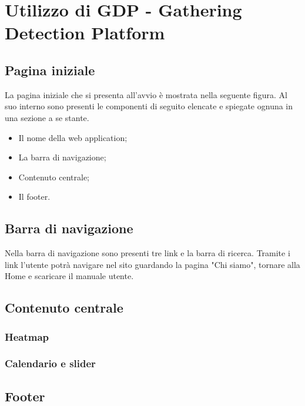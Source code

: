 \chapter{Utilizzo di GDP - Gathering Detection Platform}\label{UtilizzoDiGDPGatheringDetecionPlatform}

\section{Pagina iniziale}\label{UtilizzoDiGDPGatheringDetecionPlatformPaginaIniziale}
La pagina iniziale che si presenta all'avvio è mostrata nella seguente figura.
Al suo interno sono presenti le componenti di seguito elencate e spiegate ognuna in una sezione a se stante.
\begin{itemize}
	\item Il nome della web application;
	\item La barra di navigazione;
	\item Contenuto centrale;
	\item Il footer.
\end{itemize}

\section{Barra di navigazione}\label{UtilizzoDiGDPGatheringDetecionPlatformBarraDiNavigazione}

Nella barra di navigazione sono presenti tre link e la barra di ricerca. Tramite i link l'utente potrà navigare nel sito guardando la pagina "Chi siamo", tornare alla Home e scaricare il manuale utente.

\section{Contenuto centrale}\label{UtilizzoDiGDPGatheringDetecionPlatformContenutoCentrale}

\subsection{Heatmap}\label{UtilizzoDiGDPGatheringDetecionPlatformContenutoCentraleHeatmap}

\subsection{Calendario e slider}\label{UtilizzoDiGDPGatheringDetecionPlatformContenutoCentraleCalendarioESlider}

\section{Footer}\label{UtilizzoDiGDPGatheringDetecionPlatformFooter}